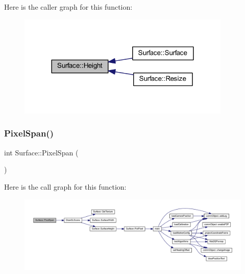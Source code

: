 Here is the caller graph for this function\+:
\nopagebreak
\begin{figure}[H]
\begin{center}
\leavevmode
\includegraphics[width=288pt]{class_surface_ab901f48d51b3fd427415b580dc15518c_icgraph}
\end{center}
\end{figure}
\mbox{\label{class_surface_abe0d542404575c60911d6ad4219560f9}} 
\subsubsection{\texorpdfstring{Pixel\+Span()}{PixelSpan()}}
{\footnotesize\ttfamily int Surface\+::\+Pixel\+Span (\begin{DoxyParamCaption}{ }\end{DoxyParamCaption})\hspace{0.3cm}{\ttfamily [inline]}}

Here is the call graph for this function\+:
\nopagebreak
\begin{figure}[H]
\begin{center}
\leavevmode
\includegraphics[width=350pt]{class_surface_abe0d542404575c60911d6ad4219560f9_cgraph}
\end{center}
\end{figure}
\mbox{\label{class_surface_a728571d0386e9690ce1760931562c72b}} 
